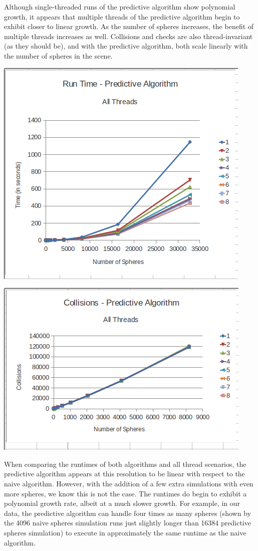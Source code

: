 \documentclass[conference]{IEEEtran}
\begin{document}
Although single-threaded runs of the predictive algorithm show polynomial growth, it appears that multiple threads of the predictive algorithm begin to exhibit closer to linear growth.  As the number of spheres increases, the benefit of multiple threads increases as well.  Collisions and checks are also thread-invariant (as they should be), and with the predictive algorithm, both scale linearly with the number of spheres in the scene.

\begin{center}
	\includegraphics[width=.45\textwidth]{runtime_predictive_allthreads.png}
\end{center}

\begin{center}
	\includegraphics[width=.45\textwidth]{collisions_predictive_allthreads.png}
\end{center}

When comparing the runtimes of both algorithms and all thread scenarios, the predictive algorithm appears at this resolution to be linear with respect to the naive algorithm.  However, with the addition of a few extra simulations with even more spheres, we know this is not the case.  The runtimes do begin to exhibit a polynomial growth rate, albeit at a much slower growth.  For example, in our data, the predictive algorithm can handle four times as many spheres (shown by the 4096 naive spheres simulation runs just slightly longer than 16384 predictive spheres simulation) to execute in approximately the same runtime as the naive algorithm.
\end{document}
